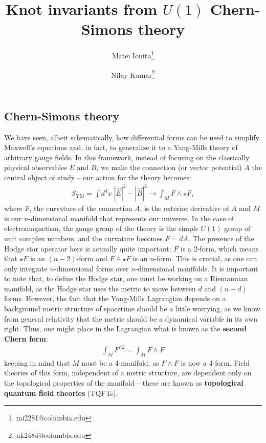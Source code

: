 \documentclass[12pt]{article}
\title{Knot invariants from $U(1)$ Chern-Simons theory}
\author{Matei Ionita\thanks{mi2281@columbia.edu}}
\author{Nilay Kumar\thanks{nk2484@columbia.edu}}
\affil{Columbia University}
\begin{document}
\maketitle

\subsection*{Chern-Simons theory}

We have seen, albeit schematically, how differential forms can be used to simplify Maxwell's equations
and, in fact, to generalize it to a Yang-Mills theory of arbitrary gauge fields. In this framework, instead of focusing on the
classically physical observables $E$ and $B$, we make the connection (or vector potential) $A$ the central
object of study -- our action for the theory becomes:
\begin{align*}
    S_{\text{YM}}=\int d^4x\; |\vec{E}|^2-|\vec{B}|^2\to\int_M F\wedge\star F,
\end{align*}
where $F$, the curvature of the connection $A$, is the exterior derivative of $A$ and $M$ is our $n$-dimensional
manifold that represents our universe. In the case of electromagnetism, the gauge group of the theory is the
simple $U(1)$ group of unit complex numbers, and the curvature becomes $F=dA$.
The presence of the
Hodge star operator here is actually quite important: $F$ is a 2-form, which means that $\star F$ is
an $(n-2)$-form and $F\wedge\star F$ is an $n$-form. This is crucial, as one can only integrate $n$-dimensional
forms over $n$-dimensional manifolds. It is important to note that, to define the Hodge star, one
must be working on a Riemannian manifold, as the Hodge star uses the metric to move between $d$ and $(n-d)$ forms.
However, the fact that the Yang-Mills Lagrangian depends on a background metric structure of spacetime should be a little 
worrying, as we know from general relativity that the metric should be a dynamical variable in its own right.
Thus, one might place in the Lagrangian what is known as the \textbf{second Chern form}\cite{baez}:
\begin{align*}
    \int_M F^{\wedge 2}=\int_M F\wedge F
\end{align*}
keeping in mind that $M$ must be a 4-manifold, as $F\wedge F$ is now a 4-form. Field theories of this form,
independent of a metric structure, are dependent only on the topological properties of the manifold -- these
are known as \textbf{topological quantum field theories} (TQFTs). 
\end{document}
